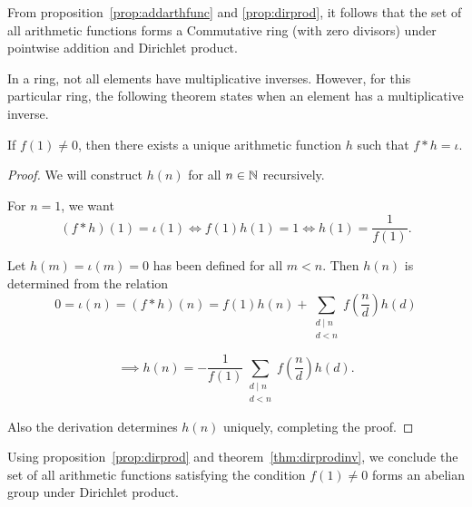 \begin{remark}
    From proposition~\ref{prop:addarthfunc} and \ref{prop:dirprod}, it follows that the set of all arithmetic functions forms a Commutative ring (with zero divisors) under pointwise addition and Dirichlet product.  
\end{remark}

In a ring, not all elements have multiplicative inverses. However, for this particular ring, the following theorem states when an element has a multiplicative inverse.

\begin{theorem}\label{thm:dirprodinv}
    If $f(1) \neq 0$, then there exists a unique arithmetic function $h$ such that $f \ast h = \iota$.
\end{theorem}
\begin{proof}
    We will construct $h(n)$ for all $n \in \mathbb{N}$ recursively.

    For $n = 1$, we want \[(f \ast h)(1) = \iota(1) \Leftrightarrow  f(1)h(1) = 1 \Leftrightarrow h(1) = \frac{1}{f(1)}.\]

    Let $h(m) = \iota(m) = 0$ has been defined for all $m < n$. Then $h(n)$ is determined from the relation \[0 = \iota(n) = (f\ast h)(n) = f(1)h(n) + \sum_{\substack{d\mid n \\ d < n}} f\left(\frac{n}{d}\right)h(d)\]

    \[\implies h(n) = -\frac{1}{f(1)} \sum_{\substack{d\mid n \\ d < n}} f\left(\frac{n}{d}\right)h(d).\]

    Also the derivation determines $h(n)$ uniquely, completing the proof.
\end{proof}
\begin{remark}
    Using proposition~\ref{prop:dirprod} and theorem~\ref{thm:dirprodinv}, we conclude the set of all arithmetic functions satisfying the condition $f(1) \neq 0$ forms an abelian group under Dirichlet product.
\end{remark}